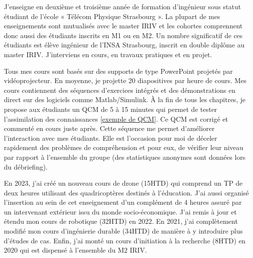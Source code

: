 \documentclass[a4paper,12pt]{article}
\begin{document}

J’enseigne en deuxième et troisième année de formation d’ingénieur sous statut
étudiant de l’école « Télécom Physique Strasbourg ». La plupart de mes
enseignements sont mutualisés avec le master IRIV et les cohortes comprennent donc aussi des étudiants inscrits en M1 ou en M2. Un nombre significatif de ces étudiants est élève ingénieur de l’INSA Strasbourg, inscrit en double diplôme au master IRIV. J’interviens en cours, en travaux pratiques et en projet.

Tous mes cours sont basés sur des supports de type PowerPoint projetés par vidéoprojecteur. En moyenne, je projette 20 diapositives par heure de cours. Mes cours contiennent des séquences d’exercices intégrés et des démonstrations en direct sur des logiciels comme Matlab/Simulink. À la fin de tous les chapitres, je propose aux étudiants un QCM de 5 à 15 minutes qui permet de tester l’assimilation des connaissances [\href{https://docs.google.com/forms/d/18JizlS3drjelkc4IQsd0PguedCdYTxuA80YoaMUxwCc}{exemple de QCM}]. Ce QCM est corrigé et commenté en cours juste après. Cette séquence me permet d’améliorer l’interaction avec mes
étudiants. Elle est l’occasion pour moi de déceler rapidement des problèmes de compréhension et pour eux, de vérifier leur niveau par rapport à l’ensemble du groupe (des statistiques anonymes sont données lors du débriefing).

En 2023, j’ai créé un nouveau cours de drone (15HTD) qui comprend un TP de deux heures utilisant des quadricoptères destinés à l’éducation. J’ai aussi organisé l’insertion au sein de cet enseignement d’un complément de 4 heures assuré par un intervenant extérieur issu du monde socio-économique. J’ai remis à jour et étendu mon cours de robotique (32HTD) en 2022. En 2021, j’ai complètement modifié mon cours d’ingénierie durable (34HTD) de manière à y introduire plus d’études de cas. Enfin, j’ai monté un cours d’initiation à la recherche (8HTD) en 2020 qui est dispensé à l’ensemble du M2 IRIV.
\end{document}
